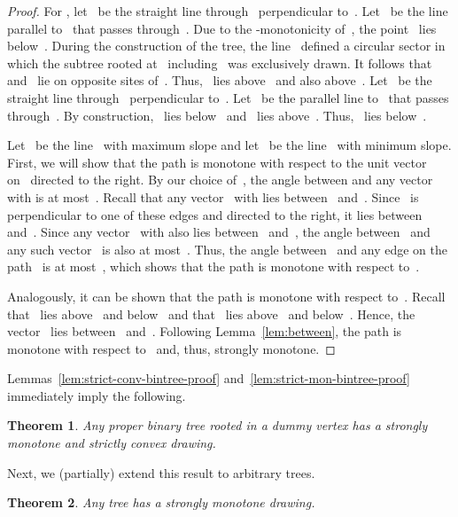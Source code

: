 \documentclass[a4paper,11pt]{article}
\theoremstyle{plain}
\newtheorem{theorem}{Theorem}
\begin{document}
\begin{proof}
    For , let~ be the straight line through~ perpendicular 
    to~. Let~ be the line parallel to~ 
    that passes through~. Due to the -monotonicity of~, the point~ 
    lies below~. During the construction of the tree, the line~
    defined a circular sector in which the subtree rooted at~ including~ 
    was exclusively drawn. It follows that~ and~ lie on opposite sites 
    of~. Thus,~ lies above~ and also above~. 
    Let~ be the straight line through~ perpendicular 
    to~. Let~ be the parallel line to~ 
    that passes through~. By construction,~ lies below~ and~ lies
    above~. Thus,~ lies below~.
    
    Let~ be the line~ with maximum slope and let~ be the line~
    with minimum slope. First, we will show that the path is monotone with 
    respect to the unit vector~ on~ directed to the right. By our choice 
    of~, the angle between  and any vector~
    with 
    is at most~. Recall that any vector~
    with  lies between~ and~. Since~ is 
    perpendicular to one of these edges and directed to the right, it lies 
    between~ and~. Since any 
    vector~ with  also lies 
    between~ and~, the angle between~ and
    any such vector~
    is also at most~. Thus, the angle between~ and any edge on the
    path~ is at most~, which shows that the path is monotone with respect 
    to~.
    
    Analogously, it can be shown that the path is monotone with respect 
    to~. Recall that~ lies above~ and below~ and 
    that~ lies above~ and below~.  Hence, the 
    vector~ lies between~ and~. Following 
    Lemma~\ref{lem:between}, the path is monotone with respect 
    to~ and, thus, strongly monotone.
\end{proof}

Lemmas~\ref{lem:strict-conv-bintree-proof} 
and~\ref{lem:strict-mon-bintree-proof} immediately imply the following.

\begin{theorem}\label{thm:strict-mon-bintree-proof}
  Any proper binary tree rooted in a dummy vertex
  has a strongly monotone and strictly convex drawing.
\end{theorem}

Next, we (partially) extend this result to arbitrary trees.

\begin{theorem}\label{thm:strict-mon-tree-proof}
  Any tree has a strongly monotone drawing.
\end{theorem}
\end{document}
